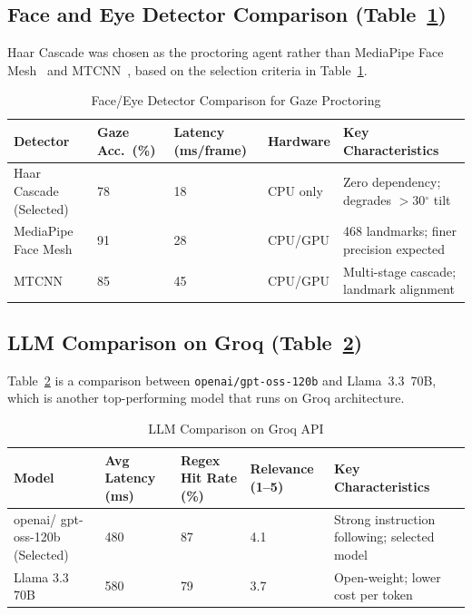 \documentclass[conference]{IEEEtran}
\begin{document}
\subsection{Face and Eye Detector Comparison (Table~\ref{tab:gaze})}

Haar Cascade was chosen as the proctoring agent rather than MediaPipe
Face Mesh~\cite{lugaresi2019mediapipe} and
MTCNN~\cite{zhang2016mtcnn}, based on the selection criteria in
Table~\ref{tab:gaze}.

\begin{table}[htbp]
  \caption{Face/Eye Detector Comparison for Gaze Proctoring}
  \label{tab:gaze}
  \centering
  \setlength{\tabcolsep}{3pt}
  \renewcommand{\arraystretch}{1.2}
  \begin{tabular}{p{1.5cm} p{1.6cm} p{1.3cm} p{1.1cm} p{1.4cm}}
    \toprule
    \textbf{Detector} &
    \textbf{Gaze Acc.\ (\%)} &
    \textbf{Latency (ms/frame)} &
    \textbf{Hardware} &
    \textbf{Key Characteristics} \\
    \midrule
    Haar Cascade (Selected)
      & 78
      & 18
      & CPU only
      & Zero dependency; degrades $>$30$^\circ$ tilt \\
    MediaPipe Face Mesh \cite{lugaresi2019mediapipe}
      & 91
      & 28
      & CPU/GPU
      & 468 landmarks; finer precision expected \\
    MTCNN \cite{zhang2016mtcnn}
      & 85
      & 45
      & CPU/GPU
      & Multi-stage cascade; landmark alignment \\
    \bottomrule
  \end{tabular}
\end{table}

\subsection{LLM Comparison on Groq (Table~\ref{tab:llm})}

Table~\ref{tab:llm} is a comparison between \texttt{openai/gpt-oss-120b}
and Llama~3.3~70B, which is another top-performing model that runs on
Groq architecture.

\begin{table}[htbp]
  \caption{LLM Comparison on Groq API}
  \label{tab:llm}
  \centering
  \setlength{\tabcolsep}{3pt}
  \renewcommand{\arraystretch}{1.2}
  \begin{tabular}{p{1.9cm} p{1.3cm} p{1.4cm} p{1.3cm} p{1.4cm}}
    \toprule
    \textbf{Model} &
    \textbf{Avg Latency (ms)} &
    \textbf{Regex Hit Rate (\%)} &
    \textbf{Relevance (1--5)} &
    \textbf{Key Characteristics} \\
    \midrule
    openai/ gpt-oss-120b (Selected)
      & 480
      & 87
      & 4.1
      & Strong instruction following; selected model \\
    Llama 3.3 70B
      & 580
      & 79
      & 3.7
      & Open-weight; lower cost per token \\
    \bottomrule
  \end{tabular}
\end{table}
\end{document}
